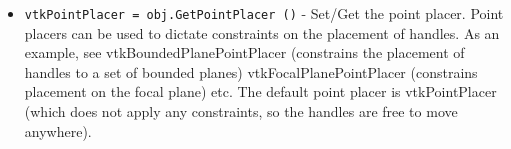 \begin{itemize}
\item  \verb|vtkPointPlacer = obj.GetPointPlacer ()| -  Set/Get the point placer. Point placers can be used to dictate constraints 
 on the placement of handles. As an example, see vtkBoundedPlanePointPlacer
 (constrains the placement of handles to a set of bounded planes)
 vtkFocalPlanePointPlacer (constrains placement on the focal plane) etc.
 The default point placer is vtkPointPlacer (which does not apply any 
 constraints, so the handles are free to move anywhere).

\end{itemize}
